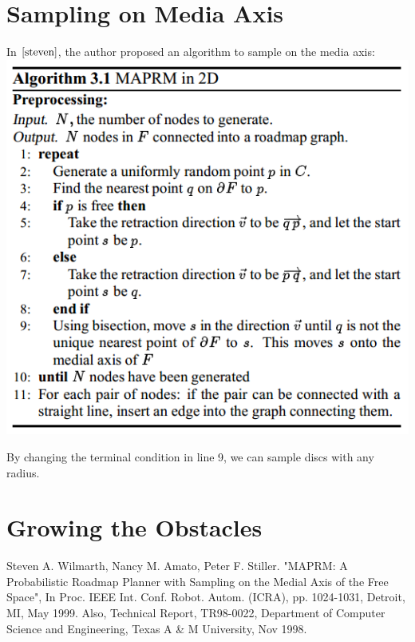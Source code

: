 \documentclass[12pt]{article}
\begin{document}
  
  \section{Sampling on Media Axis} 
  
  In $\cite{steven}$, the author proposed an algorithm to sample on the media axis:\\
  
  \includegraphics[scale=0.6]{./sampling2d/MAPRM.png}  
  
  By changing the terminal condition in line 9, we can sample discs with any radius. \\
    
  \section{Growing the Obstacles}

        
  
  \begin{thebibliography}{1}

   Steven A. Wilmarth, Nancy M. Amato, Peter F. Stiller. "MAPRM: A Probabilistic Roadmap Planner with Sampling on the Medial Axis of the Free Space", In Proc. IEEE Int. Conf. Robot. Autom. (ICRA), pp. 1024-1031, Detroit, MI, May 1999. Also, Technical Report, TR98-0022, Department of Computer Science and Engineering, Texas A \& M University, Nov 1998.

  \end{thebibliography}
  
\end{document}

